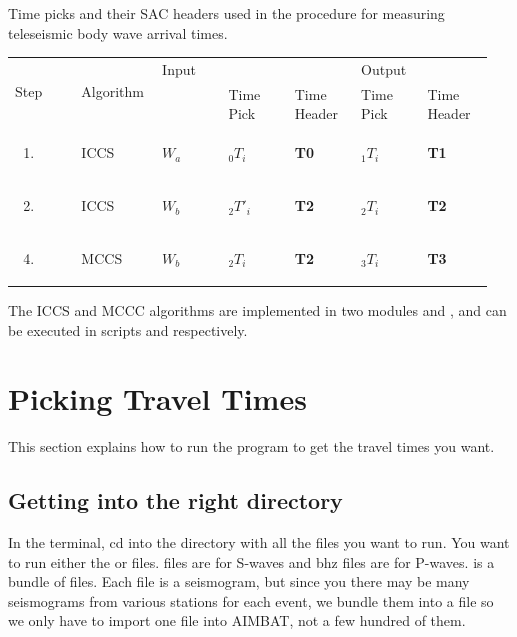 \documentclass[letterpaper,10pt,english]{sphinxmanual}
\begin{document}
\begin{threeparttable}
\capstart\caption{Time picks and their SAC headers used in the procedure for measuring teleseismic body wave arrival times.}

\begin{tabular}{|p{0.136\linewidth}|p{0.136\linewidth}|p{0.136\linewidth}|p{0.136\linewidth}|p{0.136\linewidth}|p{0.136\linewidth}|p{0.136\linewidth}|}
\hline
 \multirow{2}{*}{
Step
} &  \multirow{2}{*}{
Algorithm
} &  \multicolumn{3}{l|}{
Input
} &  \multicolumn{2}{l|}{
Output
}\\
 & 
Time Window
 &  & 
Time Pick
 & 
Time Header
 & 
Time Pick
 & 
Time Header
\\
\begin{enumerate}
\item {} 
\end{enumerate}
 & 
ICCS
 & 
\(W_a\)
 & 
\(_0T_i\)
 & 
\textbf{T0}
 & 
\(_1T_i\)
 & 
\textbf{T1}
\\
\begin{enumerate}
\setcounter{enumi}{1}
\item {} 
\end{enumerate}
 & 
ICCS
 & 
\(W_b\)
 & 
\(_2T'_i\)
 & 
\textbf{T2}
 & 
\(_2T_i\)
 & 
\textbf{T2}
\\
\begin{enumerate}
\setcounter{enumi}{3}
\item {} 
\end{enumerate}
 & 
MCCS
 & 
\(W_b\)
 & 
\(_2T_i\)
 & 
\textbf{T2}
 & 
\(_3T_i\)
 & 
\textbf{T3}
\\
\hline\end{tabular}

\end{threeparttable}


The ICCS and MCCC algorithms are implemented in two modules  and , and can be executed in scripts  and  respectively.


\section{Picking Travel Times}
\label{docfiles/PickingTravelTimes:picking-travel-times}
This section explains how to run the program  to get the travel times you want.


\subsection{Getting into the right directory}
\label{docfiles/PickingTravelTimes:getting-into-the-right-directory}
In the terminal, cd into the directory with all the  files you want to run. You want to run either the  or  files.  files are for S-waves and bhz files are for P-waves.  is a bundle of  files. Each  file is a seismogram, but since you there may be many seismograms from various stations for each event, we bundle them into a  file so we only have to import one file into AIMBAT, not a few hundred of them.
\end{document}
